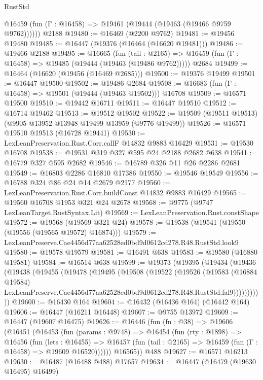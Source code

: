 \begin{lexlean}{RustStd}
\begin{coremodule}
      @16459 (fun (Γ : @16458) => @19461 (@19444 (@19463 (@19466 @9759 @9762))))))
    @2188
@19480 := @16469 (@2200 @9762)
@19481 := @19456 @19480
@19485 := @16447 (@19376 (@16464 (@16620 @19481)))
@19486 := @19466 @2188
@19495 := @16665
    (fun (tail : @2165) => @16459 (fun (Γ : @16458) => @19485 (@19444 (@19463 (@19486 @9762)))))
    @2684
@19499 := @16464 (@16620 (@19456 (@16469 @2685)))
@19500 := @19376 @19499
@19501 := @16447 @19500
@19502 := @19486 @2684
@19508 := @16683 (fun (Γ : @16458) => @19501 (@19444 (@19463 @19502))) @16708
@19509 := @16571 @19500
@19510 := @19442 @16711
@19511 := @16447 @19510
@19512 := @16714 @19462
@19513 := @19512 @19502
@19522 := @19509 (@19511 @19513) (@9905 @13952 @13948 @19499 @13959 (@9776 @19499))
@19526 := @16571 @19510 @19513 (@16728 @19441)
@19530 := LexLeanPreservation.Rust.Corr.callF @14832 @9883 @16429
@19531 := @19530 @16708
@19538 := @19531 @319 @327 @595 @24 @2188 @2682 @638
@19541 := @16779 @327 @595 @2682
@19546 := @16789 @326 @11 @26 @2286 @2681
@19549 := @16803 @2286 @16810 @17386
@19550 := @19546 @19549
@19556 := @16788 @324 @86 @24 @14 @2679 @2177
@19560 := LexLeanPreservation.Rust.Corr.buildConst @14832 @9883 @16429
@19565 := @19560 @16708 @1953 @321 @24 @2678
@19568 := @9775 (@9747 LexLeanTarget.RustSyntax.Lit)
@19569 := LexLeanPreservation.Rust.constShape
@19572 := @19568 (@19569 @321 @24)
@19578 := @19538 (@19541 (@19550 (@19556 (@19565 @19572) @16874)))
@19579 := LexLeanPreserve.Cae4456d77aa62528ed0bd9d0612cd278.R48.RustStd.look9
@19580 := @19578 @19579
@19581 := @16491 @638
@19583 := @19580 (@16880 @19581)
@19584 := @16514 @638
@19599 := @19373
    (@19395
      (@19434
        (@19436
          (@19438
            (@19455
              (@19478
                (@19495
                  (@19508
                    (@19522
                      (@19526
                        (@19583
                          (@16884 @19584)
                          LexLeanPreserve.Cae4456d77aa62528ed0bd9d0612cd278.R48.RustStd.fal9)))))))))))
@19600 := @16430 @164
@19604 := @16432 (@16436 @164) (@16442 @164)
@19606 := @16447 (@16211 @16448)
@19607 := @9755 @13972
@19609 := @16447 (@19607 @16475)
@19626 := @16446
    (fun (fn : @38) =>
    @19606
      (@16451
        (@16453
          (fun (params : @9748) =>
          @16454
            (fun (rty : @1898) =>
            @16456
              (fun (lets : @16455) =>
              @16457 (fun (tail : @2165) => @16459 (fun (Γ : @16458) => @19609 @16520))))))
        @16565))
    @488
@19627 := @16571 @16213
@19630 := @16487 (@16488 @488) @17657
@19634 := @16447 (@16479 (@19630 @16495) @16499)

\end{coremodule}
\end{lexlean}
